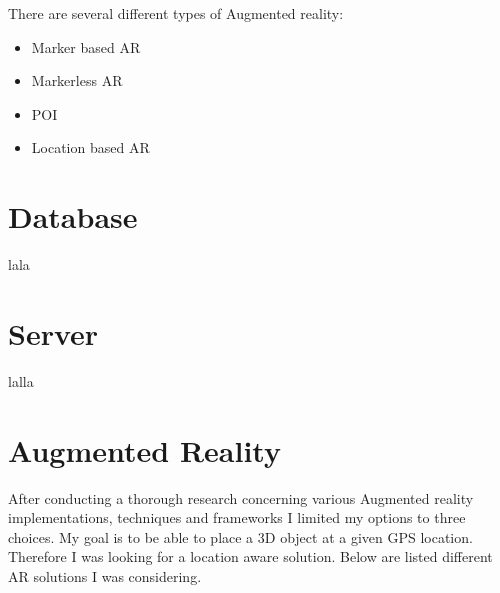 \documentclass[thesis=M,english]{FITthesis}[2012/10/20]
\begin{document}
There are several different types of Augmented reality:
\begin{itemize}
	\item{Marker based AR} \cite{ar-research}
	\item{Markerless AR}
	\item{POI}
	\item{Location based AR}
\end{itemize}

\section{Database}
lala

\section{Server}
lalla

\section{Augmented Reality}
\label{section:ar}

After conducting a thorough research concerning various Augmented reality implementations, techniques and frameworks I limited my options to three choices. My goal is to be able to place a 3D object at a given GPS location. Therefore I was looking for a location aware solution. Below are listed different AR solutions I was considering.
\end{document}
